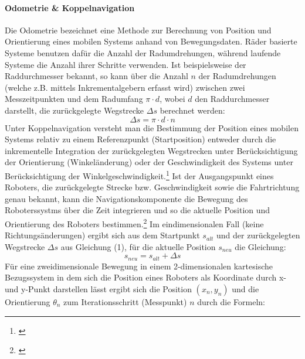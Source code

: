 \paragraph{Odometrie \& Koppelnavigation}\label{odometrie}
\color{process}
Die Odometrie bezeichnet eine Methode zur Berechnung von Position und Orientierung eines mobilen Systems anhand von Bewegungsdaten. Räder basierte Systeme benutzen dafür die Anzahl der Radumdrehungen, während laufende Systeme die Anzahl ihrer Schritte verwenden. Ist beispielsweise der Raddurchmesser bekannt, so kann über die Anzahl $n$ der Radumdrehungen (welche z.B. mittels Inkrementalgebern erfasst wird) zwischen zwei Messzeitpunkten und dem Radumfang $\pi \cdot d$, wobei $d$ den Raddurchmesser darstellt, die zurückgelegte Wegstrecke $\Delta{}s$ berechnet werden:
\begin{equation}
\Delta{}s = \pi \cdot d \cdot n
\end{equation}
Unter Koppelnavigation versteht man die Bestimmung der Position eines mobilen Systems relativ zu einem Referenzpunkt (Startposition) entweder durch die inkrementelle Integration der zurückgelegten Wegstrecken unter Berücksichtigung der Orientierung (Winkeländerung) oder der Geschwindigkeit des Systems unter Berücksichtigung der Winkelgeschwindigkeit.\footnote{\citep[vgl.][Mobile Robotik, Seite 98]{Nehmzow.MobileRobotik}\label{note16}}
\newline
Ist der Ausgangspunkt eines Roboters, die zurückgelegte Strecke bzw. Geschwindigkeit sowie die Fahrtrichtung genau bekannt, kann die Navigationskomponente die Bewegung des Roboterssystms über die Zeit integrieren und so die aktuelle Position und Orientierung des Roboters bestimmen.\footnote{\citep[vgl.][Handbuch Robotik, Seite 107 f.]{Haun.HandbuchRobotik}\label{note17}}
\newline
Im eindimensionalen Fall (keine Richtungsänderungen) ergibt sich aus dem Startpunkt $s_{alt}$ und  der zurückgelegten Wegstrecke $\Delta{}s$ aus Gleichung (1), für die aktuelle Position $s_{neu}$ die Gleichung:
\begin{equation}
s_{neu} = s_{alt} + \Delta{}s
\end{equation}
Für eine zweidimensionale Bewegung in einem 2-dimensionalen kartesische Bezugssystem in dem sich die Position eines Roboters als Koordinate durch x- und y-Punkt darstellen lässt ergibt sich die
Position $(x_{n},y_{n})$ und die Orientierung $\theta{}_{n}$ zum Iterationsschritt (Messpunkt) $n$ durch die Formeln:
